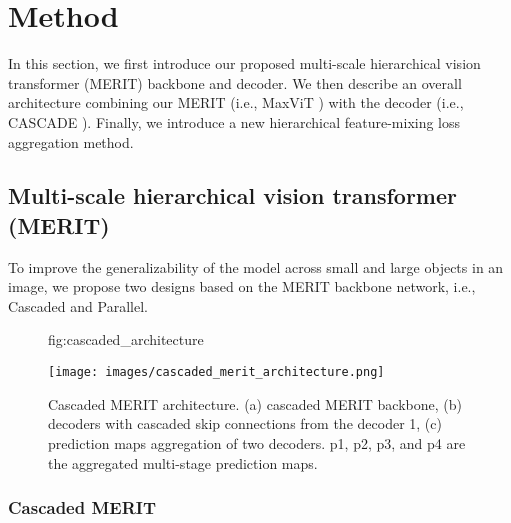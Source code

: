 \documentclass{midl}
\begin{document}
\section{Method}
\label{sec:method}
In this section, we first introduce our proposed multi-scale hierarchical vision transformer (MERIT) backbone and decoder. We then describe an overall architecture combining our MERIT (i.e., MaxViT \cite{tu2022maxvit}) with the decoder (i.e., CASCADE \cite{rahman2023medical}). Finally, we introduce a new hierarchical feature-mixing loss aggregation method. 


\subsection{Multi-scale hierarchical vision transformer (MERIT)}
To improve the generalizability of the model across small and large objects in an image, we propose two designs based on the MERIT backbone network, i.e., Cascaded and Parallel. 

\begin{figure}[t]\floatconts
  {fig:cascaded_architecture}
  {\vspace{-0.7cm} 
\caption{Cascaded MERIT architecture. (a) cascaded MERIT backbone, (b) decoders with cascaded skip connections from the decoder 1, (c) prediction maps aggregation of two decoders. p1, p2, p3, and p4 are the aggregated multi-stage prediction maps.}}
  {\texttt{[image: images/cascaded\_merit\_architecture.png]}}
  \vspace{-0.5cm}
\end{figure}


\subsubsection{Cascaded MERIT}
\label{ssec:cascaded_merit}
\end{document}
